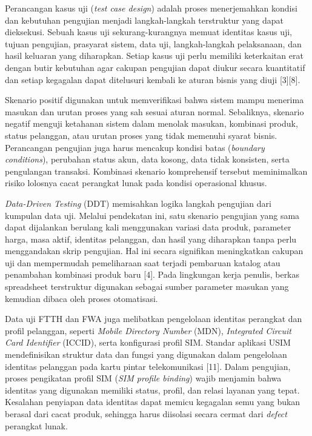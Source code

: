 \documentclass[12pt,a4paper]{article}
\begin{document}
\vspace{0.25cm}
Perancangan kasus uji (\textit{test case design}) adalah proses menerjemahkan kondisi dan kebutuhan pengujian menjadi langkah-langkah terstruktur yang dapat dieksekusi. Sebuah kasus uji sekurang-kurangnya memuat identitas kasus uji, tujuan pengujian, prasyarat sistem, data uji, langkah-langkah pelaksanaan, dan hasil keluaran yang diharapkan. Setiap kasus uji perlu memiliki keterkaitan erat dengan butir kebutuhan agar cakupan pengujian dapat diukur secara kuantitatif dan setiap kegagalan dapat ditelusuri kembali ke aturan bisnis yang diuji [3][8].

Skenario positif digunakan untuk memverifikasi bahwa sistem mampu menerima masukan dan urutan proses yang sah sesuai aturan normal. Sebaliknya, skenario negatif menguji ketahanan sistem dalam menolak masukan, kombinasi produk, status pelanggan, atau urutan proses yang tidak memenuhi syarat bisnis. Perancangan pengujian juga harus mencakup kondisi batas (\textit{boundary conditions}), perubahan status akun, data kosong, data tidak konsisten, serta pengulangan transaksi. Kombinasi skenario komprehensif tersebut meminimalkan risiko lolosnya cacat perangkat lunak pada kondisi operasional khusus.

\textit{Data-Driven Testing} (DDT) memisahkan logika langkah pengujian dari kumpulan data uji. Melalui pendekatan ini, satu skenario pengujian yang sama dapat dijalankan berulang kali menggunakan variasi data produk, parameter harga, masa aktif, identitas pelanggan, dan hasil yang diharapkan tanpa perlu menggandakan skrip pengujian. Hal ini secara signifikan meningkatkan cakupan uji dan mempermudah pemeliharaan saat terjadi pembaruan katalog atau penambahan kombinasi produk baru [4]. Pada lingkungan kerja penulis, berkas spreadsheet terstruktur digunakan sebagai sumber parameter masukan yang kemudian dibaca oleh proses otomatisasi.

Data uji FTTH dan FWA juga melibatkan pengelolaan identitas perangkat dan profil pelanggan, seperti \textit{Mobile Directory Number} (MDN), \textit{Integrated Circuit Card Identifier} (ICCID), serta konfigurasi profil SIM. Standar aplikasi USIM mendefinisikan struktur data dan fungsi yang digunakan dalam pengelolaan identitas pelanggan pada kartu pintar telekomunikasi [11]. Dalam pengujian, proses pengikatan profil SIM (\textit{SIM profile binding}) wajib menjamin bahwa identitas yang digunakan memiliki status, profil, dan relasi layanan yang tepat. Kesalahan penyiapan data identitas dapat memicu kegagalan semu yang bukan berasal dari cacat produk, sehingga harus diisolasi secara cermat dari \textit{defect} perangkat lunak.
\end{document}
